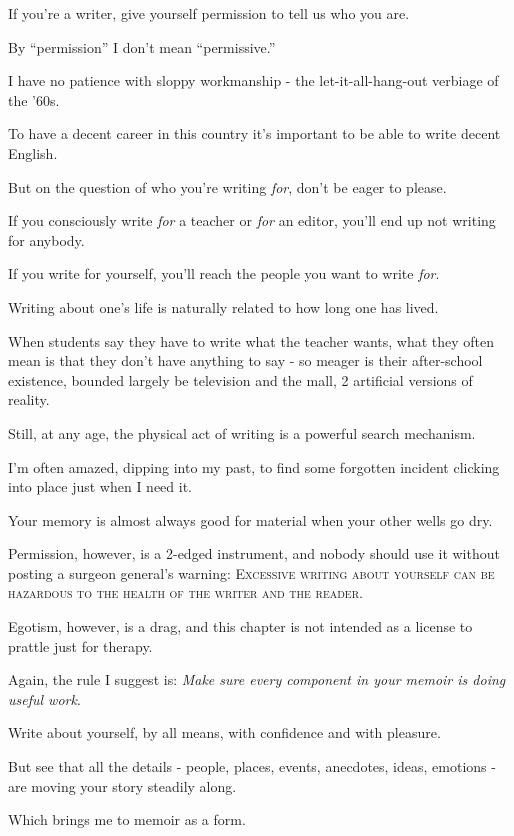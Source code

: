 \documentclass{book}
\numberwithin{equation}{section}
\begin{document}
If you're a writer, give yourself permission to tell us who you are.

%
By ``permission'' I don't mean ``permissive.''

I have no patience with sloppy workmanship - the let-it-all-hang-out verbiage of the '60s.

To have a decent career in this country it's important to be able to write decent English.

But on the question of who you're writing \textit{for}, don't be eager to please.

If you consciously write \textit{for} a teacher or \textit{for} an editor, you'll end up not writing for anybody.

If you write for yourself, you'll reach the people you want to write \textit{for}.

%
Writing about one's life is naturally related to how long one has lived.

When students say they have to write what the teacher wants, what they often mean is that they don't have anything to say - so meager is their after-school existence, bounded largely be television and the mall, 2 artificial versions of reality.

Still, at any age, the physical act of writing is a powerful search mechanism.

I'm often amazed, dipping into my past, to find some forgotten incident clicking into place just when I need it.

Your memory is almost always good for material when your other wells go dry.

%
Permission, however, is a 2-edged instrument, and nobody should use it without posting a surgeon general's warning: \textsc{Excessive writing about yourself can be hazardous to the health of the writer and the reader}.


Egotism, however, is a drag, and this chapter is not intended as a license to prattle just for therapy.

Again, the rule I suggest is: \textit{Make sure every component in your memoir is doing useful work}.

Write about yourself, by all means, with confidence and with pleasure.

But see that all the details - people, places, events, anecdotes, ideas, emotions - are moving your story steadily along.

%
Which brings me to memoir as a form.
\end{document}
